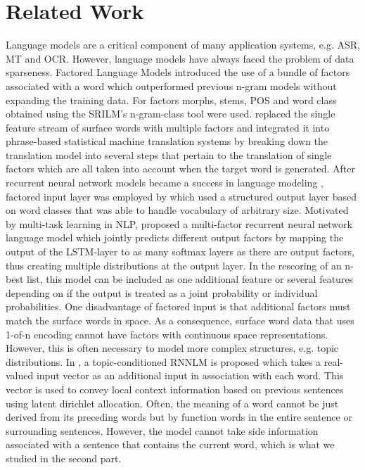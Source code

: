 \documentclass[a4paper]{article}
\begin{document}
\section{Related Work}
Language models are a critical component of many application systems, e.g. ASR, MT and OCR. However, language models have always faced the problem of data sparseness. Factored Language Models \cite{bilmes2003factored} introduced the use of a bundle of factors associated with a word which outperformed previous n-gram models without expanding the training data. For factors morphs, stems, POS and word class obtained using the SRILM's n-gram-class tool were used. \cite{koehn2007factored} replaced the single feature stream of surface words with multiple factors and integrated it into phrase-based statistical machine translation systems by breaking down the translation model into several steps that pertain to the translation of single factors which are all taken into account when the target word is generated.
After recurrent neural network models became a success in language modeling \cite{mikolov2010recurrent}, factored input layer was employed by \cite{wu2012factored} which used a structured output layer based on word classes that was able to handle vocabulary of arbitrary size.
Motivated by multi-task learning in NLP, \cite{niehuesusing} proposed a multi-factor recurrent neural network language model which jointly predicts different output factors by mapping the output of the LSTM-layer to as many softmax layers as there are output factors, thus creating multiple distributions at the output layer. In the rescoring of an n-best list, this model can be included as one additional feature or several features depending on if the output is treated as a joint probability or individual probabilities.
One disadvantage of factored input is that additional factors must match the surface words in space. As a consequence, surface word data that uses 1-of-n encoding cannot have factors with continuous space representations.
However, this is often necessary to model more complex structures, e.g. topic distributions. 
In \cite{mikolov2012context}, a topic-conditioned RNNLM is proposed which takes a real-valued input vector as an additional input in association with each word. This vector is used to convey local context information based on previous sentences using latent dirichlet allocation.
Often, the meaning of a word cannot be just derived from its preceding words but by function words in the entire sentence or surrounding sentences. 
However, the model cannot take side information associated with a sentence that contains the current word, which is what we studied in the second part.
\end{document}
